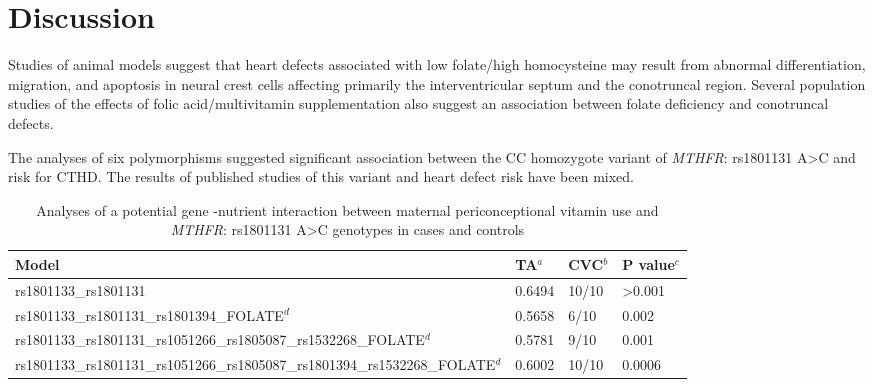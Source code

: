 \begin{refsection}
\begin{table}[tb]
\begin{tabular}{ p{1.5in} p{0.5in} p{0.5in} p{0.5in} p{0.5in} p{0.5in} p{0.5in} }
\end{tabular}
\end{table}

\section{Discussion}

Studies of animal models suggest that heart defects associated with low folate/high homocysteine may result from abnormal differentiation, migration, and apoptosis in neural crest cells affecting primarily the interventricular septum and the conotruncal region. Several population studies of the effects of folic acid/multivitamin supplementation also suggest an association between folate deficiency and conotruncal defects. 

The analyses of six polymorphisms suggested significant association between the CC homozygote variant of \textit{MTHFR}: rs1801131 A>C and risk for CTHD. The results of published studies of this variant and heart defect risk have been mixed.  


\begin{landscape}
\begin{table}[!p]
\centering
\caption[Analyses of a potential gene -nutrient interaction]{Analyses of a potential gene -nutrient interaction between maternal periconceptional vitamin use and \textit{MTHFR}: rs1801131 A>C genotypes in cases and controls}
\label{tab:6_11}
\begin{tabular}{ p{5.5in} P{1in} P{1in} P{1in} }
\toprule
	\textbf{Model} & \textbf{TA$^a$} & \textbf{CVC$^b$} &  \textbf{P value$^c$} \\ \toprule
	rs1801133\_rs1801131 & 0.6494 & 10/10 & >0.001 \\ \midrule
	rs1801133\_rs1801131\_rs1801394\_FOLATE$^d$ & 0.5658 & 6/10 & 0.002 \\ \midrule
	rs1801133\_rs1801131\_rs1051266\_rs1805087\_rs1532268\_FOLATE$^d$ & 0.5781 & 9/10 & 0.001 \\ \midrule
	rs1801133\_rs1801131\_rs1051266\_rs1805087\_rs1801394\_rs1532268\_FOLATE$^d$ & 0.6002 & 10/10 & 0.0006 \\ \bottomrule



\end{tabular}
\end{table}
\end{landscape}
\end{refsection}
